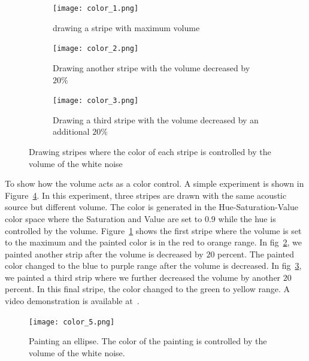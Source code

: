 \begin{figure}[h!]
\centering
  \begin{subfigure}[]{.48\textwidth}
    \texttt{[image: color\_1.png]}
    \caption{drawing a stripe with maximum volume}
    \label{fig:show_color_1_1}
  \end{subfigure}
  \begin{subfigure}[]{.48\textwidth}
    \texttt{[image: color\_2.png]}
    \caption{Drawing another stripe with the volume decreased by $20\%$}
    \label{fig:show_color_1_2}
  \end{subfigure}
  \begin{subfigure}[]{.48\textwidth}
    \texttt{[image: color\_3.png]}
    \caption{Drawing a third stripe with the volume decreased by an additional $20\%$}
    \label{fig:show_color_1_3}
  \end{subfigure}
  \caption{Drawing stripes where the color of each stripe is controlled by the volume of the white noise}
  \label{fig:show_color}
\end{figure}


To show how the volume acts as a color control. A simple experiment is shown in Figure~\ref{fig:show_color}. In this experiment, three stripes are drawn with the same acoustic source but different volume. The color is generated in the Hue-Saturation-Value color space where the Saturation and Value are set to $0.9$ while the hue is controlled by the volume. Figure~\ref{fig:show_color_1_1} shows the first stripe where the volume is set to the maximum and the painted color is in the red to orange range. In fig~\ref{fig:show_color_1_2}, we painted another strip after the volume is decreased by $20$ percent. The painted color changed to the blue to purple range after the volume is decreased. In fig~\ref{fig:show_color_1_3}, we painted a third strip where we further decreased the volume by another $20$ percent. In this final stripe, the color changed to the green to yellow range. A video demonstration is available at~\cite{demo:color}.

\begin{figure}[h!]
  \centering
    \texttt{[image: color\_5.png]}
    \caption{Painting an ellipse. The color of the painting is controlled by the volume of the white noise.}
    \label{fig:show_color_3}
\end{figure}

